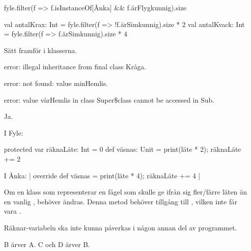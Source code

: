 \Task

\Subtask
\begin{Code}
fyle.filter(f => f.isInstanceOf[Ånka] && f.ärFlygkunnig).size
\end{Code}

\Subtask
\begin{Code}
val antalKrax: Int = fyle.filter(f => !f.ärSimkunnig).size * 2
val antalKvack: Int = fyle.filter(f => f.ärSimkunnig).size * 4
\end{Code}

\Task

\Subtask Sätt  framför  i klasserna.

\Subtask error: illegal inheritance from final class Kråga.

\Task

\Subtask error: not found: value minHemlis.

\Subtask error: value vårHemlis in class Super\$class cannot be accessed in Sub.

\Subtask Ja.

\Task

\Subtask I Fyle:
\begin{Code}
protected var räknaLäte: Int = 0
def väsnas: Unit = { print(läte * 2); räknaLäte += 2 }
\end{Code}

I Ånka: \code| override def väsnas = { print(läte * 4); räknaLäte += 4 }|

\Subtask {}

\Subtask Om en klass som representerar en fågel som skulle ge ifrån sig fler/färre läten än en vanlig , behöver  ändras. Denna metod behöver tillgång till , vilken inte får vara .

\Subtask Räknar-variabeln ska inte kunna påverkas i någon annan del av programmet.

\Task

\Subtask B ärver A. C och D ärver B.

